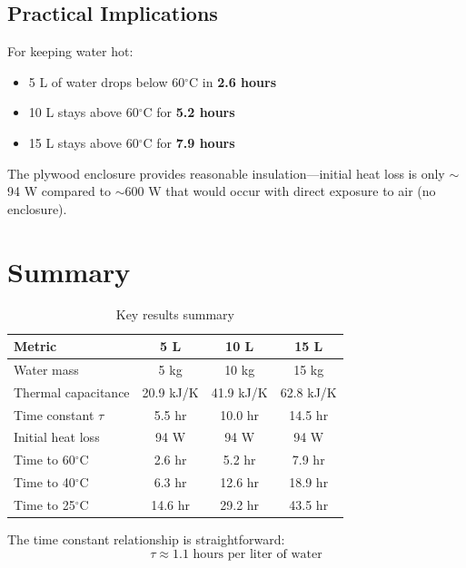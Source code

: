 \documentclass[11pt]{article}
\newcommand{\degC}{$^\circ$C}
\begin{document}
\subsection{Practical Implications}

For keeping water hot:
\begin{itemize}
    \item 5 L of water drops below 60\degC{} in \textbf{2.6 hours}
    \item 10 L stays above 60\degC{} for \textbf{5.2 hours}
    \item 15 L stays above 60\degC{} for \textbf{7.9 hours}
\end{itemize}

The plywood enclosure provides reasonable insulation---initial heat loss is only $\sim$94 W compared to $\sim$600 W that would occur with direct exposure to air (no enclosure).

\section{Summary}

\begin{table}[H]
\centering
\caption{Key results summary}
\begin{tabular}{lccc}
\toprule
\textbf{Metric} & \textbf{5 L} & \textbf{10 L} & \textbf{15 L} \\
\midrule
Water mass & 5 kg & 10 kg & 15 kg \\
Thermal capacitance & 20.9 kJ/K & 41.9 kJ/K & 62.8 kJ/K \\
Time constant $\tau$ & 5.5 hr & 10.0 hr & 14.5 hr \\
Initial heat loss & 94 W & 94 W & 94 W \\
Time to 60\degC & 2.6 hr & 5.2 hr & 7.9 hr \\
Time to 40\degC & 6.3 hr & 12.6 hr & 18.9 hr \\
Time to 25\degC & 14.6 hr & 29.2 hr & 43.5 hr \\
\bottomrule
\end{tabular}
\end{table}

The time constant relationship is straightforward:
\begin{equation}
    \boxed{\tau \approx 1.1 \text{ hours per liter of water}}
\end{equation}
\end{document}
